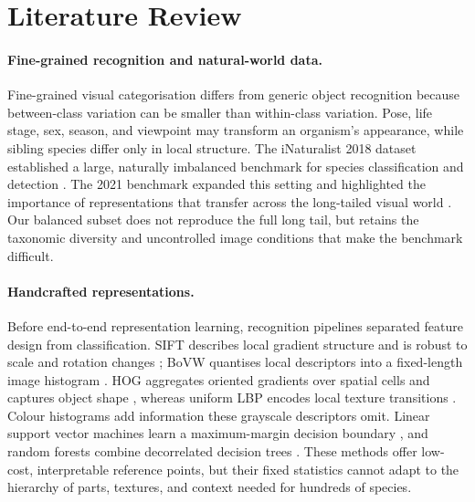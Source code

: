 \section{Literature Review}
\label{sec:literature}

\paragraph{Fine-grained recognition and natural-world data.}
Fine-grained visual categorisation differs from generic object recognition
because between-class variation can be smaller than within-class variation.
Pose, life stage, sex, season, and viewpoint may transform an organism's
appearance, while sibling species differ only in local structure.  The
iNaturalist 2018 dataset established a large, naturally imbalanced benchmark
for species classification and detection \cite{vanhorn2018inaturalist}.  The
2021 benchmark expanded this setting and highlighted the importance of
representations that transfer across the long-tailed visual world
\cite{vanhorn2021benchmarking}.  Our balanced subset does not reproduce the
full long tail, but retains the taxonomic diversity and uncontrolled image
conditions that make the benchmark difficult.

\paragraph{Handcrafted representations.}
Before end-to-end representation learning, recognition pipelines separated
feature design from classification.  SIFT describes local gradient structure
and is robust to scale and rotation changes \cite{lowe2004distinctive}; BoVW
quantises local descriptors into a fixed-length image histogram
\cite{csurka2004visual}.  HOG aggregates oriented gradients over spatial cells
and captures object shape \cite{dalal2005histograms}, whereas uniform LBP
encodes local texture transitions \cite{ojala2002multiresolution}.  Colour
histograms add information these grayscale descriptors omit.  Linear support
vector machines learn a maximum-margin decision boundary
\cite{cortes1995support}, and random forests combine decorrelated decision
trees \cite{breiman2001random}.  These methods offer low-cost, interpretable
reference points, but their fixed statistics cannot adapt to the hierarchy of
parts, textures, and context needed for hundreds of species.

